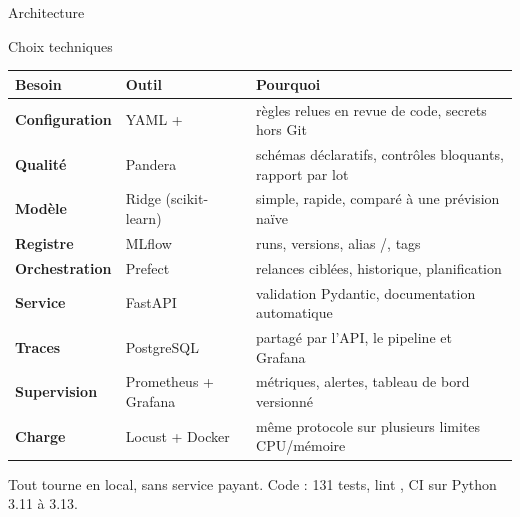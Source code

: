 \documentclass[aspectratio=169,11pt]{beamer}
\newcommand{\code}[1]{\texttt{\detokenize{#1}}}
\begin{document}
\begin{frame}{Architecture}
{}
\end{frame}

\begin{frame}{Choix techniques}
\small
\begin{tabularx}{\linewidth}{>{\bfseries}l l X}
\toprule
Besoin & Outil & Pourquoi\\
\midrule
Configuration & YAML + \code{.env} & règles relues en revue de code, secrets hors Git\\
Qualité & Pandera & schémas déclaratifs, contrôles bloquants, rapport par lot\\
Modèle & Ridge (scikit-learn) & simple, rapide, comparé à une prévision naïve\\
Registre & MLflow & runs, versions, alias \code{champion}/\code{challenger}, tags\\
Orchestration & Prefect & relances ciblées, historique, planification\\
Service & FastAPI & validation Pydantic, documentation automatique\\
Traces & PostgreSQL & partagé par l'API, le pipeline et Grafana\\
Supervision & Prometheus + Grafana & métriques, alertes, tableau de bord versionné\\
Charge & Locust + Docker & même protocole sur plusieurs limites CPU/mémoire\\
\bottomrule
\end{tabularx}
\vfill
\centering\footnotesize\color{gris}Tout tourne en local, sans service payant. Code : 131 tests, lint \code{ruff}, CI sur Python 3.11 à 3.13.
\end{frame}
\end{document}
